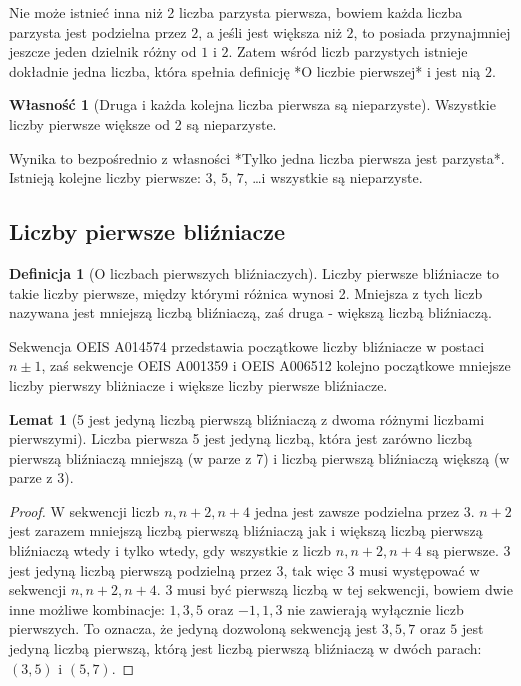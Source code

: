 \documentclass[10pt,onecolumn]{article}
\theoremstyle{definition}
\newtheorem{definition}{Definicja}
\theoremstyle{hypothesis}
\theoremstyle{capability}
\newtheorem{capability}{Własność}
\newtheorem{lemma}[theorem]{Lemat}
\begin{document}
Nie może istnieć inna niż 2 liczba parzysta pierwsza, bowiem każda liczba parzysta jest podzielna przez $2$, a jeśli jest większa niż $2$, to posiada przynajmniej jeszcze jeden dzielnik różny od $1$ i $2$. Zatem wśród liczb parzystych istnieje dokładnie jedna liczba, która spełnia definicję *O liczbie pierwszej* i jest nią $2$.

\begin{capability}[Druga i każda kolejna liczba pierwsza są nieparzyste]
Wszystkie liczby pierwsze większe od 2 są nieparzyste.
\end{capability}

Wynika to bezpośrednio z własności *Tylko jedna liczba pierwsza jest parzysta*. Istnieją kolejne liczby pierwsze: $3$, $5$, $7$, \ldots i wszystkie są nieparzyste.

\subsection{Liczby pierwsze bliźniacze}

\begin{definition}[O liczbach pierwszych bliźniaczych]
Liczby pierwsze bliźniacze to takie liczby pierwsze, między którymi różnica wynosi 2. Mniejsza z tych liczb nazywana jest mniejszą liczbą bliźniaczą, zaś druga - większą liczbą bliźniaczą.
\end{definition}

Sekwencja OEIS A014574 przedstawia początkowe liczby bliźniacze w postaci $n \pm 1$, zaś sekwencje OEIS A001359 i OEIS A006512 kolejno początkowe mniejsze liczby pierwszy bliżniacze i większe liczby pierwsze bliźniacze.

\begin{lemma}[5 jest jedyną liczbą pierwszą bliźniaczą z dwoma różnymi liczbami pierwszymi]
Liczba pierwsza 5 jest jedyną liczbą, która jest zarówno liczbą pierwszą bliźniaczą mniejszą (w parze z 7) i liczbą pierwszą bliźniaczą większą (w parze z 3).
\end{lemma}
\begin{proof}
W sekwencji liczb $n, n+2, n+4$ jedna jest zawsze podzielna przez $3$. $n+2$ jest zarazem mniejszą liczbą pierwszą bliźniaczą jak i większą liczbą pierwszą bliźniaczą wtedy i tylko wtedy, gdy wszystkie z liczb $n, n+2, n+4$ są pierwsze. $3$ jest jedyną liczbą pierwszą podzielną przez $3$, tak więc $3$ musi występować w sekwencji $n, n+2, n+4$. $3$ musi być pierwszą liczbą w tej sekwencji, bowiem dwie inne możliwe kombinacje: $1, 3, 5$ oraz $-1, 1, 3$ nie zawierają wyłącznie liczb pierwszych. To oznacza, że jedyną dozwoloną sekwencją jest $3, 5, 7$ oraz $5$ jest jedyną liczbą pierwszą, którą jest liczbą pierwszą bliźniaczą w dwóch parach: $(3, 5)$ i $(5, 7)$.
\end{proof}
\end{document}
